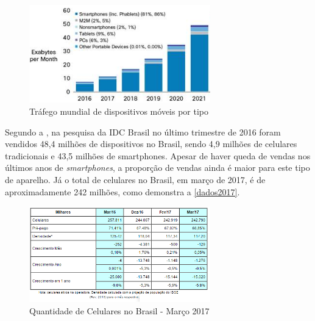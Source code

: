\begin{figure}[htb]
  \caption{\label{cisco-2017}Tráfego mundial de dispositivos móveis por tipo}
  \begin{center}
    \includegraphics[width=0.70\textwidth]{img/cisco-2017.png}
  \end{center}
\end{figure}

Segundo a , na pesquisa da IDC Brasil
no último trimestre de 2016 foram vendidos 48,4 milhões de dispositivos no Brasil, sendo 4,9 milhões de celulares tradicionais e 43,5
milhões de smartphones. Apesar
de haver queda de vendas nos últimos anos de \emph{smartphones}, a proporção de vendas ainda é maior para este tipo de aparelho. Já o total
de celulares no Brasil, em março de 2017, é de aproximadamente 242 milhões, como demonstra a \autoref{dados2017}.

\begin{figure}[!h]
  \caption{\label{dados2017}Quantidade de Celulares no Brasil - Março 2017}
  \begin{center}
    \includegraphics[width=0.7\textwidth]{img/dados2017.png}
  \end{center}
\end{figure}

